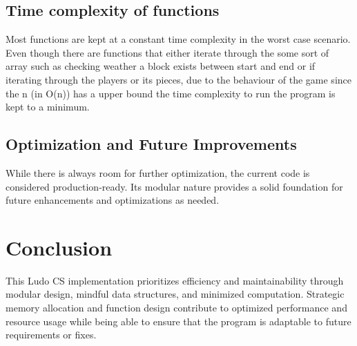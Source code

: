 \documentclass{article}
\begin{document}
\subsection{Time complexity of functions}

Most functions are kept at a constant time complexity in the worst case scenario. Even though there are functions that either iterate through the some sort of array such as checking weather a block exists between start and end or if iterating through the players or its pieces, due to the behaviour of the game since the n (in O(n)) has a upper bound the time complexity to run the program is kept to a minimum.

\subsection{Optimization and Future Improvements}

While there is always room for further optimization, the current code is considered production-ready. Its modular nature provides a solid foundation for future enhancements and optimizations as needed. 

\section{Conclusion}

This Ludo CS implementation prioritizes efficiency and maintainability through modular design, mindful data structures, and minimized computation. Strategic memory allocation and function design contribute to optimized performance and resource usage while being able to ensure that the program is adaptable to future requirements or fixes.
\end{document}
